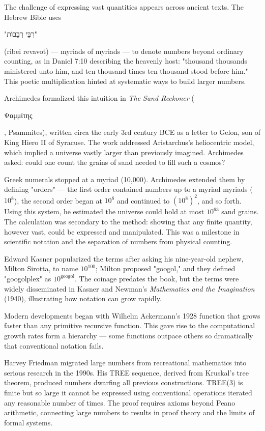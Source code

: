 
\begin{historical}
    The challenge of expressing vast quantities appears across ancient texts. The Hebrew Bible uses \begin{hebrew}"רִבֵּי רְבָבוֹת"\end{hebrew} (ribei revavot) — myriads of myriads — to denote numbers beyond ordinary counting, as in Daniel 7:10 describing the heavenly host: "thousand thousands ministered unto him, and ten thousand times ten thousand stood before him." This poetic multiplication hinted at systematic ways to build larger numbers.

Archimedes formalized this intuition in \textit{The Sand Reckoner} (\begin{greek}Ψαμμίτης\end{greek}, Psammites), written circa the early 3rd century BCE as a letter to Gelon, son of King Hiero II of Syracuse. The work addressed Aristarchus's heliocentric model, which implied a universe vastly larger than previously imagined. Archimedes asked: could one count the grains of sand needed to fill such a cosmos? 

Greek numerals stopped at a myriad (10,000). Archimedes extended them by defining "orders" — the first order contained numbers up to a myriad myriads ($10^8$), the second order began at $10^8$ and continued to $(10^8)^2$, and so forth. Using this system, he estimated the universe could hold at most $10^{63}$ sand grains. The calculation was secondary to the method: showing that any finite quantity, however vast, could be expressed and manipulated. This was a milestone in scientific notation and the separation of numbers from physical counting.

Edward Kasner popularized the terms after asking his nine-year-old nephew, Milton Sirotta, to name $10^{100}$; Milton proposed "googol," and they defined "googolplex" as $10^{\text{googol}}$. The coinage predates the book, but the terms were widely disseminated in Kasner and Newman's \textit{Mathematics and the Imagination} (1940), illustrating how notation can grow rapidly.

Modern developments began with Wilhelm Ackermann's 1928 function that grows faster than any primitive recursive function. This gave rise to the computational growth rates form a hierarchy — some functions outpace others so dramatically that conventional notation fails.

Harvey Friedman migrated large numbers from recreational mathematics into serious research in the 1990s. His TREE sequence, derived from Kruskal's tree theorem, produced numbers dwarfing all previous constructions. TREE(3) is finite but so large it cannot be expressed using conventional operations iterated any reasonable number of times. The proof requires axioms beyond Peano arithmetic, connecting large numbers to results in proof theory and the limits of formal systems.
\end{historical}